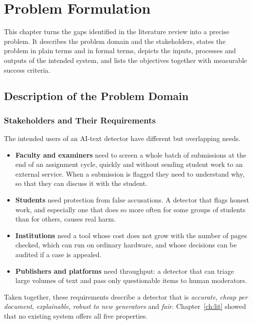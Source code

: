 \chapter{Problem Formulation}
\label{ch:problem}

This chapter turns the gaps identified in the literature review into a
precise problem. It describes the problem domain and the stakeholders,
states the problem in plain terms and in formal terms, depicts the inputs,
processes and outputs of the intended system, and lists the objectives
together with measurable success criteria.

\section{Description of the Problem Domain}

\subsection{Stakeholders and Their Requirements}

The intended users of an AI-text detector have different but overlapping
needs.
\begin{itemize}
  \item \textbf{Faculty and examiners} need to screen a whole batch of
        submissions at the end of an assignment cycle, quickly and without
        sending student work to an external service. When a submission is
        flagged they need to understand why, so that they can discuss it with
        the student.
  \item \textbf{Students} need protection from false accusations. A detector
        that flags honest work, and especially one that does so more often for
        some groups of students than for others, causes real harm.
  \item \textbf{Institutions} need a tool whose cost does not grow with the
        number of pages checked, which can run on ordinary hardware, and whose
        decisions can be audited if a case is appealed.
  \item \textbf{Publishers and platforms} need throughput: a detector that can
        triage large volumes of text and pass only questionable items to
        human moderators.
\end{itemize}
Taken together, these requirements describe a detector that is
\emph{accurate}, \emph{cheap per document}, \emph{explainable},
\emph{robust to new generators} and \emph{fair}. Chapter~\ref{ch:lit} showed
that no existing system offers all five properties.


